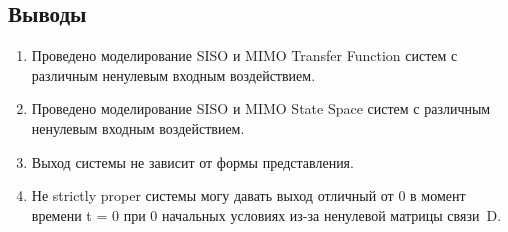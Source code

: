 \documentclass[16pt]{article}
\begin{document}
\subsection{Выводы}
\begin{enumerate}
   \item Проведено моделирование SISO и MIMO Transfer Function систем с различным ненулевым входным воздействием.
   \item Проведено моделирование SISO и MIMO State Space систем с различным ненулевым входным воздействием.
   \item Выход системы не зависит от формы представления.
   \item Не strictly proper системы могу давать выход отличный от 0 в момент времени t = 0 при 0 начальных условиях из-за ненулевой матрицы связи~D. 
\end{enumerate}
\end{document}

